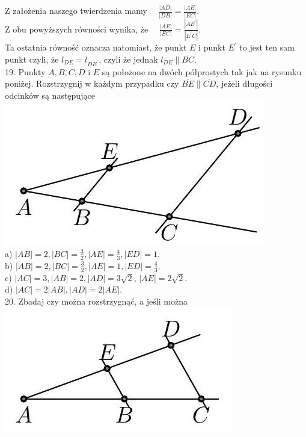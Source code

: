 \documentclass[10pt]{article}
\begin{document}
Z założenia naszego twierdzenia mamy \(\quad \frac{|A D|}{|D B|}=\frac{|A E|}{|E C|}\).\\
Z obu powyższych równości wynika, że \(\quad \frac{|A E|}{|E C|}=\frac{\left|A E^{\prime}\right|}{\left|E^{\prime} C\right|}\).\\
Ta ostatnia równość oznacza natomiast, że punkt \(E\) i punkt \(E^{\prime}\) to jest ten sam punkt czyli, że \(l_{D E}=l_{D E^{\prime}}\), czyli że jednak \(l_{D E} \| \overline{B C}\).\\
19. Punkty \(A, B, C, D\) i \(E\) są położone na dwóch półprostych tak jak na rysunku poniżej. Rozstrzygnij w każdym przypadku czy \(\overline{B E} \| \overline{C D}\), jeżeli długości odcinków są następujące\\
\includegraphics[max width=\textwidth, center]{2024_11_21_e9b4faa005d5be2cc318g-013(1)}\\
a) \(|A B|=2,|B C|=\frac{3}{2},|A E|=\frac{4}{3},|E D|=1\).\\
b) \(|A B|=2,|B C|=\frac{3}{2},|A E|=1,|E D|=\frac{4}{3}\).\\
c) \(|A C|=3,|A B|=2,|A D|=3 \sqrt{2}\), \(|A E|=2 \sqrt{2}\).\\
d) \(|A C|=2|A B|,|A D|=2|A E|\).\\
20. Zbadaj czy można rozstrzygnąć, a jeśli można\\
\includegraphics[max width=\textwidth, center]{2024_11_21_e9b4faa005d5be2cc318g-013}\\
\end{document}
